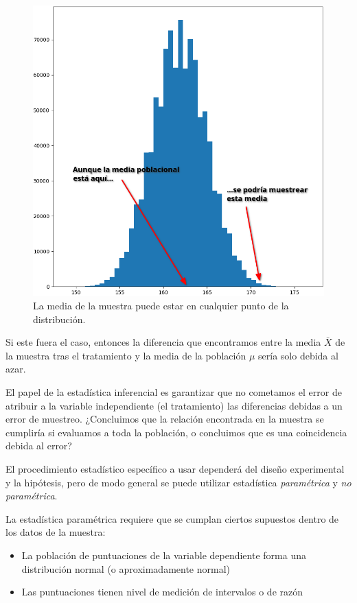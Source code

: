 \documentclass[a4paper,12pt]{article}
\begin{document}
\begin{figure}[!ht]
  \begin{center}
    \includegraphics[scale=0.5]{curvaNormal.png}
    \caption{La media de la muestra puede estar en cualquier punto de la distribución.}
  \end{center}
\end{figure}

Si este fuera el caso, entonces la diferencia que encontramos entre la media $\bar{X}$ de la muestra tras el tratamiento y la media de la población $\mu$ sería solo debida al azar.

El papel de la estadística inferencial es garantizar que no cometamos el error de atribuir a la variable independiente (el tratamiento) las diferencias debidas a un error de muestreo. ¿Concluimos que la relación encontrada en la muestra se cumpliría si evaluamos a toda la población, o concluimos que es una coincidencia debida al error?

El procedimiento estadístico específico a usar dependerá del diseño experimental y la hipótesis, pero de modo general se puede utilizar estadística {\itshape paramétrica} y {\itshape no paramétrica}.

La estadística paramétrica requiere que se cumplan ciertos supuestos dentro de los datos de la muestra:
\begin{itemize}
  \item La población de puntuaciones de la variable dependiente forma una distribución normal (o aproximadamente normal)
  \item Las puntuaciones tienen nivel de medición de intervalos o de razón
\end{itemize}
\end{document}
